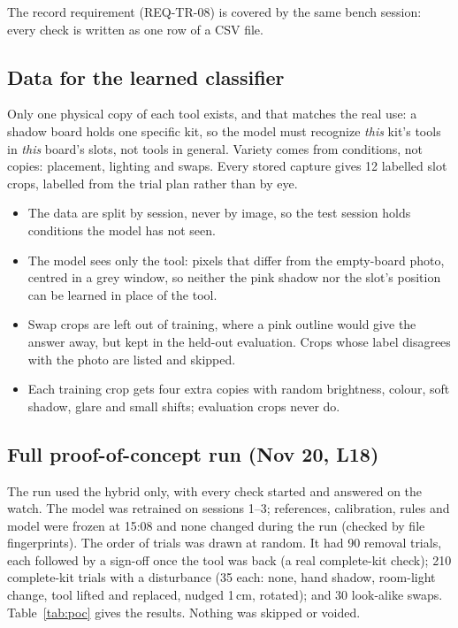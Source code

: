 The record requirement (REQ-TR-08) is covered by the same bench session:
every check is written as one row of a CSV file.

\subsection{Data for the learned classifier}
Only one physical copy of each tool exists, and that matches the real use: a
shadow board holds one specific kit, so the model must recognize \emph{this}
kit's tools in \emph{this} board's slots, not tools in general. Variety comes
from conditions, not copies: placement, lighting and swaps. Every stored
capture gives 12 labelled slot crops, labelled from the trial plan rather
than by eye.

\begin{itemize}
\item The data are split by session, never by image, so the test session
holds conditions the model has not seen.
\item The model sees only the tool: pixels that differ from the empty-board
photo, centred in a grey window, so neither the pink shadow nor the slot's
position can be learned in place of the tool.
\item Swap crops are left out of training, where a pink outline would give
the answer away, but kept in the held-out evaluation. Crops whose label
disagrees with the photo are listed and skipped.
\item Each training crop gets four extra copies with random brightness,
colour, soft shadow, glare and small shifts; evaluation crops never do.
\end{itemize}

\subsection{Full proof-of-concept run (Nov 20, L18)}
The run used the hybrid only, with every check started and answered on
the watch. The model was retrained on sessions 1--3; references,
calibration, rules and model were frozen at 15:08 and none changed during
the run (checked by file fingerprints). The order of trials was drawn at
random. It had 90 removal trials, each followed by a sign-off once the
tool was back (a real complete-kit check); 210 complete-kit trials with a
disturbance (35 each: none, hand shadow, room-light change, tool lifted
and replaced, nudged 1\,cm, rotated); and 30 look-alike swaps.
Table~\ref{tab:poc} gives the results. Nothing was skipped or voided.


